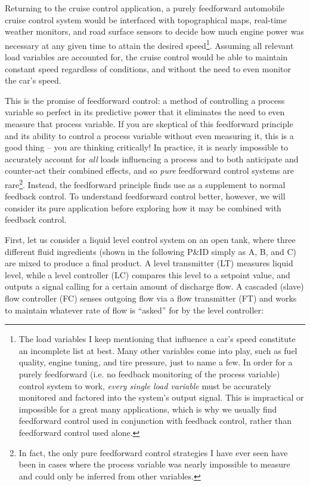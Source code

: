 Returning to the cruise control application, a purely feedforward automobile cruise control system would be interfaced with topographical maps, real-time weather monitors, and road surface sensors to decide how much engine power was necessary at any given time to attain the desired speed\footnote{The load variables I keep mentioning that influence a car's speed constitute an incomplete list at best.  Many other variables come into play, such as fuel quality, engine tuning, and tire pressure, just to name a few.  In order for a purely feedforward (i.e. no feedback monitoring of the process variable) control system to work, \textit{every single load variable} must be accurately monitored and factored into the system's output signal.  This is impractical or impossible for a great many applications, which is why we usually find feedforward control used in conjunction with feedback control, rather than feedforward control used alone.}.  Assuming all relevant load variables are accounted for, the cruise control would be able to maintain constant speed regardless of conditions, and without the need to even monitor the car's speed.

This is the promise of feedforward control: a method of controlling a process variable so perfect in its predictive power that it eliminates the need to even measure that process variable.  If you are skeptical of this feedforward principle and its ability to control a process variable without even measuring it, this is a good thing -- you are thinking critically!  In practice, it is nearly impossible to accurately account for \textit{all} loads influencing a process and to both anticipate and counter-act their combined effects, and so \textit{pure} feedforward control systems are rare\footnote{In fact, the only pure feedforward control strategies I have ever seen have been in cases where the process variable was nearly impossible to measure and could only be inferred from other variables.}.  Instead, the feedforward principle finds use as a supplement to normal feedback control.  To understand feedforward control better, however, we will consider its pure application before exploring how it may be combined with feedback control.

\vskip 10pt

\filbreak

First, let us consider a liquid level control system on an open tank, where three different fluid ingredients (shown in the following P\&ID simply as A, B, and C) are mixed to produce a final product.  A level transmitter (LT) measures liquid level, while a level controller (LC) compares this level to a setpoint value, and outputs a signal calling for a certain amount of discharge flow.  A cascaded (slave) flow controller (FC) senses outgoing flow via a flow transmitter (FT) and works to maintain whatever rate of flow is ``asked'' for by the level controller:

